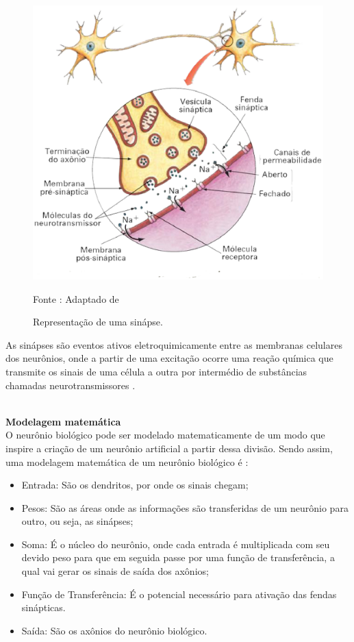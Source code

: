     \begin{figure}[ht]
        \centering
        \label{fig02}
            \includegraphics[keepaspectratio=true, scale=0.4]{editaveis/images/sinapse.eps}
        \caption{Representação de uma sinápse.}
        Fonte : Adaptado de \cite{marieb2009}
    \end{figure}

    As sinápses são eventos ativos eletroquimicamente entre as membranas celulares dos neurônios, onde a partir de uma excitação ocorre uma reação química que transmite os sinais de uma célula a outra por intermédio de substâncias chamadas neurotransmissores \cite{marieb2009}.

\noindent
\\
\textbf{Modelagem matemática} \\

    O neurônio biológico pode ser modelado matematicamente de um modo que inspire a criação de um neurônio artificial a partir dessa divisão. Sendo assim, uma modelagem matemática de um neurônio biológico é \cite{rocha2006}:

    \begin{itemize}
        \item Entrada: São os dendritos, por onde os sinais chegam;
        \item Pesos: São as áreas onde as informações são transferidas de um neurônio para outro,  ou seja, as sinápses;
        \item Soma: É o núcleo do neurônio, onde cada entrada é multiplicada com seu devido peso para que em seguida passe por uma função de transferência, a qual vai gerar os sinais de saída dos axônios;
        \item Função de Transferência: É o potencial necessário para ativação das fendas sinápticas.
        \item Saída: São os axônios do neurônio biológico.
    \end{itemize}

